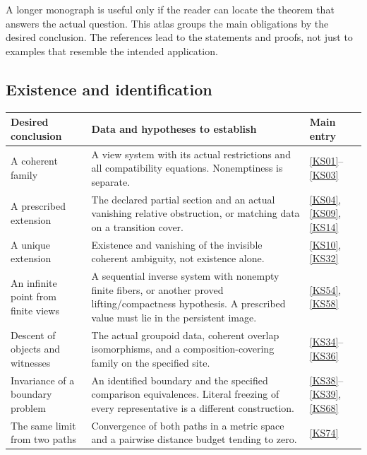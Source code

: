 \clearpage
{}\label{app:hypotheses}
A longer monograph is useful only if the reader can locate the theorem that answers the actual question. This atlas groups the main obligations by the desired conclusion. The references lead to the statements and proofs, not just to examples that resemble the intended application.

\subsection{Existence and identification}
\begin{longtable}{@{}p{.24\linewidth}p{.48\linewidth}p{.21\linewidth}@{}}
\toprule Desired conclusion & Data and hypotheses to establish & Main entry\\\midrule\endhead
A coherent family & A view system with its actual restrictions and all compatibility equations. Nonemptiness is separate. & \ref{KS01}--\ref{KS03}\\[4pt]
A prescribed extension & The declared partial section and an actual vanishing relative obstruction, or matching data on a transition cover. & \ref{KS04}, \ref{KS09}, \ref{KS14}\\[4pt]
A unique extension & Existence and vanishing of the invisible coherent ambiguity, not existence alone. & \ref{KS10}, \ref{KS32}\\[4pt]
An infinite point from finite views & A sequential inverse system with nonempty finite fibers, or another proved lifting/compactness hypothesis. A prescribed value must lie in the persistent image. & \ref{KS54}, \ref{KS58}\\[4pt]
Descent of objects and witnesses & The actual groupoid data, coherent overlap isomorphisms, and a composition-covering family on the specified site. & \ref{KS34}--\ref{KS36}\\[4pt]
Invariance of a boundary problem & An identified boundary and the specified comparison equivalences. Literal freezing of every representative is a different construction. & \ref{KS38}--\ref{KS39}, \ref{KS68}\\[4pt]
The same limit from two paths & Convergence of both paths in a metric space and a pairwise distance budget tending to zero. & \ref{KS74}\\
\bottomrule
\end{longtable}

